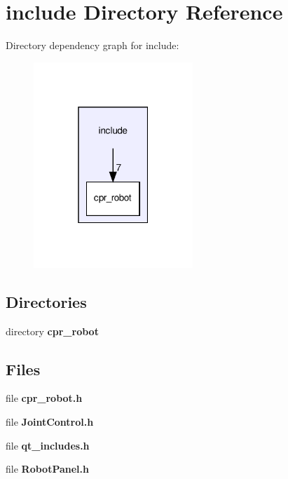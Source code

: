\section{include Directory Reference}
\label{dir_d44c64559bbebec7f509842c48db8b23}
Directory dependency graph for include\+:
\nopagebreak
\begin{figure}[H]
\begin{center}
\leavevmode
\includegraphics[width=170pt]{dir_d44c64559bbebec7f509842c48db8b23_dep}
\end{center}
\end{figure}
\subsection*{Directories}
\begin{DoxyCompactItemize}
\item 
directory \textbf{ cpr\+\_\+robot}
\end{DoxyCompactItemize}
\subsection*{Files}
\begin{DoxyCompactItemize}
\item 
file \textbf{ cpr\+\_\+robot.\+h}
\item 
file \textbf{ Joint\+Control.\+h}
\item 
file \textbf{ qt\+\_\+includes.\+h}
\item 
file \textbf{ Robot\+Panel.\+h}
\end{DoxyCompactItemize}
